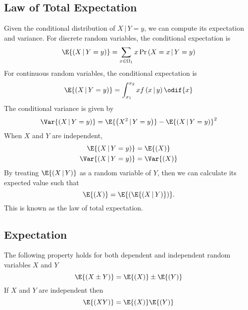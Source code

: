 \documentclass{article}
\begin{document}
\begin{multicols}{3}
    \subsection{Law of Total Expectation}
    Given the conditional distribution of \(X \,\vert\, Y = y\), we can compute its expectation and variance.
    For discrete random variables, the conditional expectation is
    \begin{equation*}
        \E{\left( X \,\vert\, Y = y \right)} = \sum_{x\in\Omega_1} x \Pr{\left( X = x \,\vert\, Y = y \right)}
    \end{equation*}
    For continuous random variables, the conditional expectation is
    \begin{equation*}
        \E{\left( X \,\vert\, Y = y \right)} = \int_{x_1}^{x_2} x f\left( x \,\vert\, y \right) \odif{x}
    \end{equation*}
    The conditional variance is given by
    \begin{equation*}
        \Var{\left( X \,\vert\, Y = y \right)} = \E{\left( X^2 \,\vert\, Y = y \right)} - \E{\left( X \,\vert\, Y = y \right)}^2
    \end{equation*}
    When \(X\) and \(Y\) are independent,
    \begin{align*}
        \E{\left( X \,\vert\, Y = y \right)}   & = \E{\left( X \right)}   \\
        \Var{\left( X \,\vert\, Y = y \right)} & = \Var{\left( X \right)} \\
    \end{align*}
    By treating \(\E{\left( X \,\vert\, Y \right)}\) as a random variable of \(Y\), then
    we can calculate its expected value such that
    \begin{equation*}
        \E{\left( X \right)} = \E{\left( \E{\left( X \,\vert\, Y \right)} \right)}.
    \end{equation*}
    This is known as the law of total expectation.
    \subsection{Expectation}
    The following property holds for both dependent and independent random variables \(X\) and \(Y\)
    \begin{equation*}
        \E{\left( X \pm Y \right)} = \E{\left( X \right)} \pm \E{\left( Y \right)}
    \end{equation*}
    If \(X\) and \(Y\) are independent then
    \begin{equation*}
        \E{\left( XY \right)} = \E{\left( X \right)} \E{\left( Y \right)}
    \end{equation*}

\end{multicols}
\end{document}
